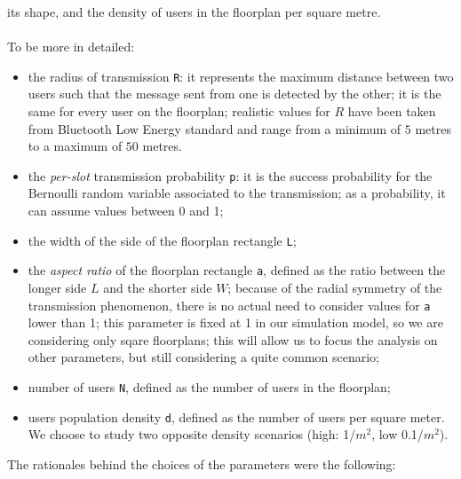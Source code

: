 its shape, and the density of users in the floorplan per square metre.\\
\\
To be more in detailed:
\begin{itemize}
	\item the radius of transmission \colorbox{gray!30}{\large \texttt{R}}: it
	represents the maximum distance between two users such that the message
	sent from one is detected by the other; it is the same for every user on
	the floorplan; realistic values for $R$ have been taken from Bluetooth Low
	Energy standard and range from a minimum of $5$ metres to a maximum of $50$
	metres.
	\item the \textit{per-slot} transmission probability
	\colorbox{gray!30}{\large \texttt{p}}: it is the success probability for the
	Bernoulli random variable associated to the transmission; as a probability,
	it can assume values between 0 and 1;
    \item the width of the side of the floorplan rectangle
    \colorbox{gray!30}{\large \texttt{L}};
	\item the \textit{aspect ratio} of the floorplan rectangle
	\colorbox{gray!30}{\large \texttt{a}}, defined as the ratio between the
	longer side $L$ and the shorter side $W$; because of the radial symmetry of
	the transmission phenomenon, there is no actual need to consider values for
	\texttt{a} lower than 1; this parameter is fixed at 1 in our simulation model, 
	so we are considering only sqare floorplans; this will allow us to focus the
	analysis on other parameters, but still considering a quite common scenario;
	\item number of users \colorbox{gray!30}{\large \texttt{N}}, defined
	as the number of users in the floorplan;
	\item users population density \colorbox{gray!30}{\large \texttt{d}},
	defined as the number of users per square meter. We choose to study two
	opposite density scenarios (high: 1/$m^2$, low 0.1/$m^2$).
\end{itemize}
The rationales behind the choices of the parameters were the following:
